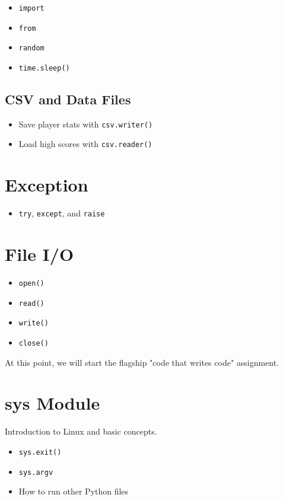 \documentclass{article}
\begin{document}
\begin{itemize}
    \item \verb|import|
    \item \verb|from|
    \item \verb|random|
    \item \verb|time.sleep()|
\end{itemize}
\subsection{CSV and Data Files}
\begin{itemize}
    \item Save player stats with \verb|csv.writer()|
    \item Load high scores with \verb|csv.reader()|
\end{itemize}

\section{Exception}

\begin{itemize}
    \item \verb|try|, \verb|except|, and \verb|raise|
\end{itemize}

\section{File I/O}

\begin{itemize}
    \item \verb|open()|
    \item \verb|read()|
    \item \verb|write()|
    \item \verb|close()|
\end{itemize}

At this point, we will start the flagship "code that writes code" assignment.

\section{sys Module}

Introduction to Linux and basic concepts.

\begin{itemize}
    \item \verb|sys.exit()|
    \item \verb|sys.argv|
    \item How to run other Python files
\end{itemize}
\end{document}

